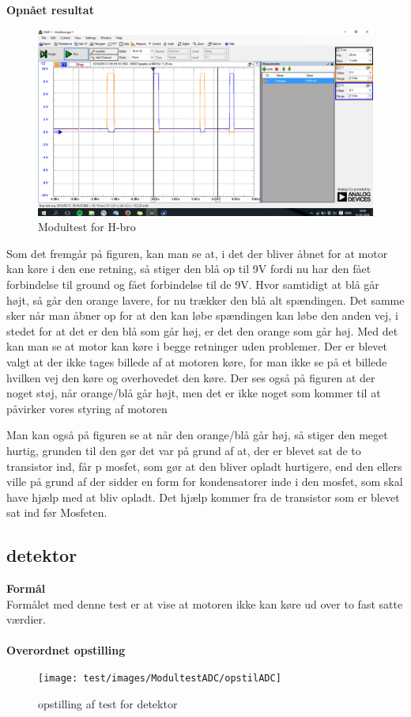 \textbf{Opnået resultat}
\begin{figure}[H]
	\centering
	\includegraphics[width=\textwidth]{test/images/testhbro}
	\caption{Modultest for H-bro}
	
\end{figure}
 Som det fremgår på figuren, kan man se at, i det der bliver åbnet for at motor kan køre i den ene retning, så stiger den blå op til 9V fordi nu har den fået forbindelse til ground og fået forbindelse til de 9V. Hvor samtidigt at blå går højt, så går den orange lavere, for nu trækker den blå alt spændingen. Det samme sker når man åbner op for at den kan løbe spændingen kan løbe den anden vej, i stedet for at det er den blå som går høj, er det den orange som går høj. Med det kan man se at motor kan køre i begge retninger uden problemer.
 Der er blevet valgt at der ikke tages billede af at motoren køre, for man ikke se på et billede hvilken vej den køre og overhovedet den køre. Der ses også på figuren at der noget støj, når orange/blå går højt, men det er ikke noget som kommer til at påvirker vores styring af motoren

Man kan også på figuren se at når den orange/blå går høj, så stiger den meget hurtig, grunden til den gør det var på grund af at, der er blevet sat de to transistor ind, får p mosfet, som gør at den bliver opladt hurtigere, end den ellers ville på grund af der sidder en form for kondensatorer inde i den mosfet, som skal have hjælp med at bliv opladt. Det hjælp kommer fra de transistor som er blevet sat ind før Mosfeten.  

\subsection{detektor}

\textbf{Formål}
\\ Formålet med denne test er at vise at motoren ikke kan køre ud over to fast satte værdier.\\
\\
\textbf{Overordnet opstilling}
\begin{figure}[H]
	\centering
	\texttt{[image: test/images/ModultestADC/opstilADC]}
	\caption{opstilling af test for detektor}
\end{figure}


